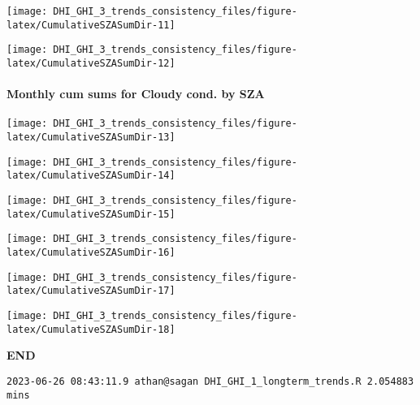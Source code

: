 \documentclass[
  10pt,
  a4paper,oneside]{article}
\begin{document}
\begin{center}\texttt{[image: DHI\_GHI\_3\_trends\_consistency\_files/figure-latex/CumulativeSZASumDir-11]} \end{center}

\begin{center}\texttt{[image: DHI\_GHI\_3\_trends\_consistency\_files/figure-latex/CumulativeSZASumDir-12]} \end{center}

\newpage

\FloatBarrier

\hypertarget{monthly-cum-sums-for-cloudy-cond.-by-sza-1}{%
\paragraph{Monthly cum sums for Cloudy cond. by SZA}\label{monthly-cum-sums-for-cloudy-cond.-by-sza-1}}

\begin{center}\texttt{[image: DHI\_GHI\_3\_trends\_consistency\_files/figure-latex/CumulativeSZASumDir-13]} \end{center}

\begin{center}\texttt{[image: DHI\_GHI\_3\_trends\_consistency\_files/figure-latex/CumulativeSZASumDir-14]} \end{center}

\begin{center}\texttt{[image: DHI\_GHI\_3\_trends\_consistency\_files/figure-latex/CumulativeSZASumDir-15]} \end{center}

\begin{center}\texttt{[image: DHI\_GHI\_3\_trends\_consistency\_files/figure-latex/CumulativeSZASumDir-16]} \end{center}

\begin{center}\texttt{[image: DHI\_GHI\_3\_trends\_consistency\_files/figure-latex/CumulativeSZASumDir-17]} \end{center}

\begin{center}\texttt{[image: DHI\_GHI\_3\_trends\_consistency\_files/figure-latex/CumulativeSZASumDir-18]} \end{center}

\textbf{END}

\begin{verbatim}
2023-06-26 08:43:11.9 athan@sagan DHI_GHI_1_longterm_trends.R 2.054883 mins
\end{verbatim}
\end{document}
